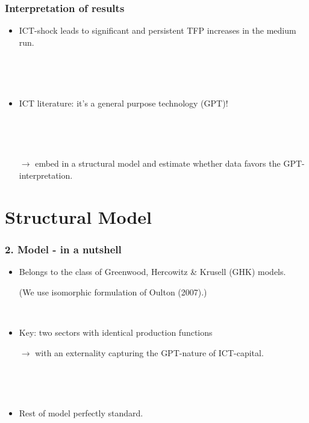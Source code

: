 \documentclass{beamer}
\begin{document}
\begin{frame}
	\frametitle{Interpretation of results}
	
	\begin{itemize}
	\item ICT-shock leads to significant and persistent TFP increases in the medium run.
	
	\
	
	\
	
	\item ICT literature: it's a general purpose technology (GPT)!
	
	\
	
	\
	
	\item[$\rightarrow$] embed in a structural model and estimate whether data favors the GPT-interpretation.
	\end{itemize}

	
	
	
	

\end{frame}

\section{Structural Model}

\begin{frame}
	\frametitle{2. Model - in a nutshell}
	
	\begin{itemize}
	\item Belongs to the class of Greenwood, Hercowitz \& Krusell (GHK) models. 
	
	(We use isomorphic formulation of Oulton (2007).)
	
	\
	
	\item Key: two sectors with identical production functions
	\item[$\rightarrow$] with an externality capturing the GPT-nature of ICT-capital.
	
	\
	
	\
	
	\item	Rest of model perfectly standard.
	\end{itemize}
	

\end{frame}
\end{document}
